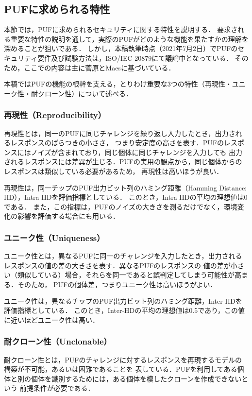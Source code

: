 \documentclass[technicalreport]{ieicej} %
\begin{document}
\subsection{PUFに求められる特性}
本節では，PUFに求められるセキュリティに関する特性を説明する．
要求される重要な特性の説明を通して，実際のPUFがどのような機能を果たすかの理解を深めることが狙いである．
しかし，本稿執筆時点（2021年7月2日）でPUFのセキュリティ要件及び試験方法は，ISO/IEC 20879にて議論中となっている．
そのため，ここでの内容は主に菅原\cite{sugatake}とMaes\cite{maes1}に基づいている．

本稿ではPUFの機能の根幹を支える，とりわけ重要な3つの特性（再現性・ユニーク性・耐クローン性）について述べる．
\subsubsection{再現性（Reproducibility）}
再現性とは，同一のPUFに同じチャレンジを繰り返し入力したとき，出力されるレスポンスのばらつきの小ささ，
つまり安定度の高さを表す．PUFのレスポンスにはノイズが含まれており，同じ個体に同じチャレンジを入力しても
出力されるレスポンスには差異が生じる．PUFの実用の観点から，同じ個体からのレスポンスは類似している必要があるため，
再現性は高いほうが良い．

再現性は，同一チップのPUF出力ビット列のハミング距離（Hamming Distance: HD），Intra-HDを評価指標としている．
このとき，Intra-HDの平均の理想値は0である．
また，この指標は，PUFのノイズの大きさを測るだけでなく，環境変化の影響を評価する場合にも用いる．
\subsubsection{ユニーク性（Uniqueness）}
ユニーク性とは，異なるPUFに同一のチャレンジを入力したとき，出力されるレスポンスの値の差の大きさを表す．異なるPUFのレスポンスの
値の差が小さい（類似している）場合，それらを同一であると誤判定してしまう可能性が高まる．そのため，
PUFの個体差，つまりユニーク性は高いほうがよい．

ユニーク性は，異なるチップのPUF出力ビット列のハミング距離，Inter-HDを評価指標としている．
このとき，Inter-HDの平均の理想値は0.5であり，この値に近いほどユニーク性は高い．
\subsubsection{耐クローン性（Unclonable）}
耐クローン性とは，PUFのチャレンジに対するレスポンスを再現するモデルの構築が不可能，あるいは困難であることを
表している．PUFを利用してある個体と別の個体を識別するためには，ある個体を模したクローンを作成できないという
前提条件が必要である．
\end{document}
